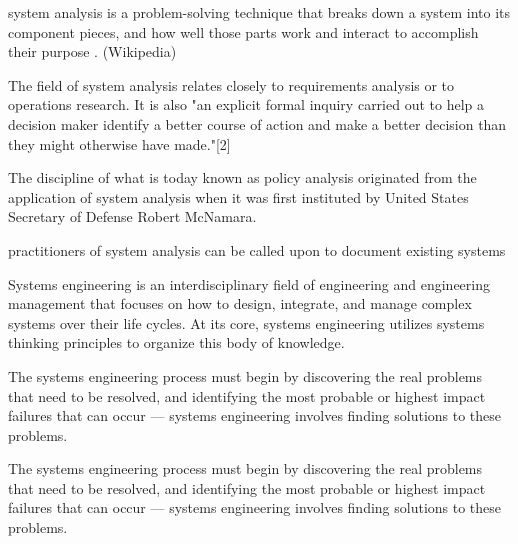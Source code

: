  
 system analysis is a problem-solving technique that breaks down a system into its component pieces, and how well those parts work and interact to accomplish their purpose . (Wikipedia)

The field of system analysis relates closely to requirements analysis or to operations research. It is also "an explicit formal inquiry carried out to help a decision maker identify a better course of action and make a better decision than they might otherwise have made."[2] 

The discipline of what is today known as policy analysis originated from the application of system analysis when it was first instituted by United States Secretary of Defense Robert McNamara.

practitioners of system analysis can be called upon to document existing systems 

Systems engineering is an interdisciplinary field of engineering and engineering management that focuses on how to design, integrate, and manage complex systems over their life cycles. At its core, systems engineering utilizes systems thinking principles to organize this body of knowledge. 

The systems engineering process must begin by discovering the real problems that need to be resolved, and identifying the most probable or highest impact failures that can occur — systems engineering involves finding solutions to these problems. 

The systems engineering process must begin by discovering the real problems that need to be resolved, and identifying the most probable or highest impact failures that can occur — systems engineering involves finding solutions to these problems. 
